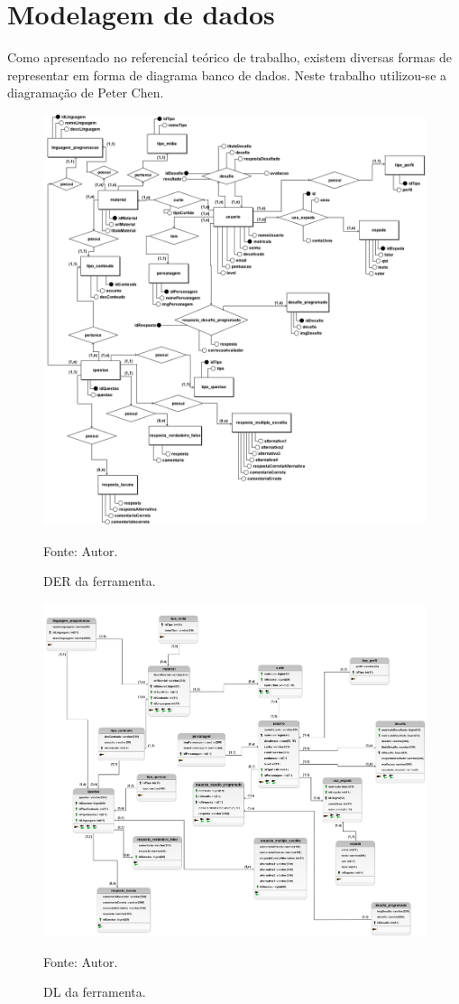 \section{Modelagem de dados}
Como apresentado no referencial teórico de trabalho, existem diversas formas de representar em forma de diagrama banco de dados. Neste trabalho utilizou-se a diagramação de Peter Chen.
\begin{figure}[h]
	\centering
	\includegraphics[keepaspectratio=true,scale=0.4]{figuras/der.png}
	\caption{DER da ferramenta.}
	Fonte: Autor.
	\label{figura2}
\end{figure}
\pagebreak

\begin{figure}[h]
	\centering
	\includegraphics[keepaspectratio=true,scale=0.32]{figuras/dl.png}
	\caption{DL da ferramenta.}
	Fonte: Autor.
	\label{figura3}
\end{figure}

